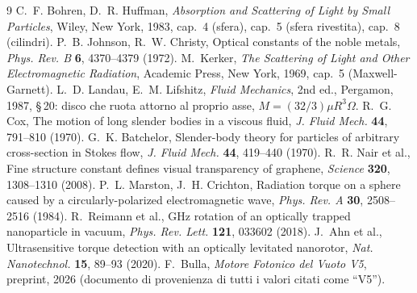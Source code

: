 \documentclass[11pt,a4paper]{article}
\begin{document}
\begin{thebibliography}{9}\small
{} C.~F. Bohren, D.~R. Huffman, \emph{Absorption and Scattering of Light
by Small Particles}, Wiley, New York, 1983, cap.~4 (sfera), cap.~5 (sfera
rivestita), cap.~8 (cilindri).
 P.~B. Johnson, R.~W. Christy, Optical constants of the noble metals,
\emph{Phys. Rev. B} \textbf{6}, 4370--4379 (1972).
 M.~Kerker, \emph{The Scattering of Light and Other Electromagnetic
Radiation}, Academic Press, New York, 1969, cap.~5 (Maxwell-Garnett).
 L.~D. Landau, E.~M. Lifshitz, \emph{Fluid Mechanics}, 2nd ed.,
Pergamon, 1987, \S\,20: disco che ruota attorno al proprio asse,
$M=(32/3)\mu R^3\Omega$.
 R.~G. Cox, The motion of long slender bodies in a viscous fluid,
\emph{J. Fluid Mech.} \textbf{44}, 791--810 (1970).
 G.~K. Batchelor, Slender-body theory for particles of arbitrary
cross-section in Stokes flow, \emph{J. Fluid Mech.} \textbf{44}, 419--440 (1970).
 R.~R. Nair et al., Fine structure constant defines visual
transparency of graphene, \emph{Science} \textbf{320}, 1308--1310 (2008).
 P.~L. Marston, J.~H. Crichton, Radiation torque on a sphere caused
by a circularly-polarized electromagnetic wave, \emph{Phys. Rev. A} \textbf{30},
2508--2516 (1984).
 R.~Reimann et al., GHz rotation of an optically trapped nanoparticle
in vacuum, \emph{Phys. Rev. Lett.} \textbf{121}, 033602 (2018).
 J.~Ahn et al., Ultrasensitive torque detection with an optically
levitated nanorotor, \emph{Nat. Nanotechnol.} \textbf{15}, 89--93 (2020).
 F.~Bulla, \emph{Motore Fotonico del Vuoto V5}, preprint, 2026
(documento di provenienza di tutti i valori citati come ``V5'').
\end{thebibliography}
\end{document}
